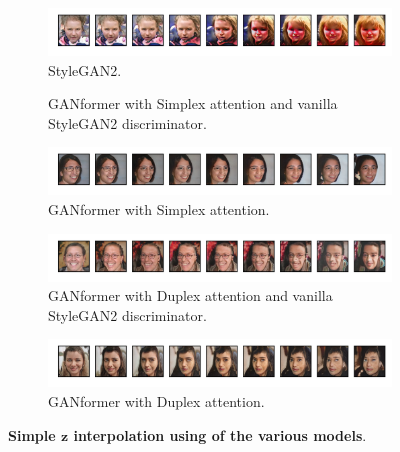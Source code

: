 \documentclass{article}
\begin{document}
\begin{figure}[htpb]
	\centering
	\begin{subfigure}{\linewidth}
		\includegraphics[width=\linewidth]{ffhq-interpolation_Stylegan2.png}
		\vspace{-7mm}
		\caption{StyleGAN2.} 
	\end{subfigure}
	\begin{subfigure}{\linewidth}
		\vspace{-7mm}
		\caption{GANformer with Simplex attention and vanilla StyleGAN2 discriminator.}
	\end{subfigure}
	\begin{subfigure}{\linewidth}
		\includegraphics[width=\linewidth]{ffhq-interpolation_GANFormerSimplexAtt.png}
		\vspace{-7mm}
		\caption{GANformer with Simplex attention.}
	\end{subfigure}
	\begin{subfigure}{\linewidth}
		\includegraphics[width=\linewidth]{ffhq-interpolation_GANFormerDuplexNoAtt.png}
		\vspace{-7mm}
		\caption{GANformer with Duplex attention and vanilla StyleGAN2 discriminator.}
	\end{subfigure}
	\begin{subfigure}{\linewidth}
		\includegraphics[width=\linewidth]{ffhq-interpolation_GANFormerDuplexAtt.png}
		\vspace{-7mm}
		\caption{GANformer with Duplex attention.}
	\end{subfigure}
	\vspace{3mm}
	\caption{\textbf{Simple $\mathbf{z}$ interpolation using of the various models}.} 
	\label{fig:interpolation-ffhq}
\end{figure}


\clearpage


\clearpage
\end{document}
